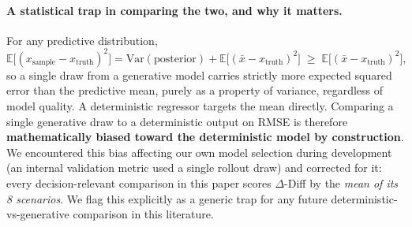 \documentclass[11pt]{article}
\newcommand{\ours}{\mbox{$\Delta$-Diff}}       %
\begin{document}
\paragraph{A statistical trap in comparing the two, and why it matters.}
For any predictive distribution,
\begin{equation}
\mathbb{E}\big[(x_{\text{sample}} - x_{\text{truth}})^2\big]
  = \mathrm{Var}(\text{posterior}) + \mathbb{E}\big[(\bar{x} - x_{\text{truth}})^2\big]
  \;\geq\; \mathbb{E}\big[(\bar{x} - x_{\text{truth}})^2\big],
\end{equation}
so a single draw from a generative model carries strictly more expected
squared error than the predictive mean, purely as a property of variance,
regardless of model quality. A deterministic regressor targets the mean
directly. Comparing a single generative draw to a deterministic output on
RMSE is therefore \textbf{mathematically biased toward the deterministic
model by construction}. We encountered this bias affecting our own model
selection during development (an internal validation metric used a single
rollout draw) and corrected for it: every decision-relevant comparison in
this paper scores \ours{} by the \emph{mean of its 8 scenarios}. We flag
this explicitly as a generic trap for any future
deterministic-vs-generative comparison in this literature.
\end{document}
